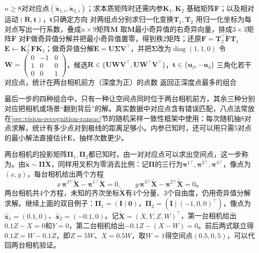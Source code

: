 \begin{algorithm}[归一化八点法与本质矩阵分解]
  \label{alg:vision-formation-eight-point}
  \begin{algorithmic}[1]
    \Require $n\ge8$对对应点$(\tilde{\bm x}_{1,i},\tilde{\bm x}_{2,i})$；求本质矩阵时还需内参$\bm K_1,\bm K_2$
    \Ensure 基础矩阵$\bm F$；以及相对运动$(\bm R,\bm t)$，$\bm t$只确定方向
    \State 对两组点分别求归一化变换$\bm T_1,\bm T_2$
    \State 用归一化坐标为每对点写出一行系数，叠成$n\times9$矩阵$\bm M$
    \State 取$\bm M$最小奇异值的右奇异向量，排成$3\times3$矩阵$\tilde{\bm F}$
    \State 对$\tilde{\bm F}$做奇异值分解并把最小奇异值置零，得到秩2矩阵；还原$\bm F=\bm T_2^\top\tilde{\bm F}\bm T_1$
    \State $\bm E\gets\bm K_2^\top\bm F\bm K_1$；做奇异值分解$\bm E=\bm U\bm\Sigma\bm V^\top$，并把$\bm\Sigma$改为$\operatorname{diag}(1,1,0)$
    \State 令$\bm W=\begin{pmatrix}0&-1&0\\1&0&0\\0&0&1\end{pmatrix}$，候选$\bm R\in\{\bm U\bm W\bm V^\top,\bm U\bm W^\top\bm V^\top\}$，$\bm t\in\{\bm u_3,-\bm u_3\}$
      \State 三角化若干对应点，统计在两台相机前方（深度为正）的点数
    \EndFor
    \State 返回正深度点最多的组合
  \end{algorithmic}
\end{algorithm}

最后一步的四种组合中，只有一种让空间点同时位于两台相机前方，其余三种分别对应把相机或场景“翻到背后”的解。真实数据中对应点含有错误匹配，八点法常放在\ref{sec:vision-recognition-ransac}节的随机采样一致性框架中使用：每次随机抽8对点求解，统计有多少点对到极线的距离足够小。内参已知时，还可以用只需5对点的最小解法直接估计$\bm E$，抽样次数更少。

两台相机的投影矩阵$\bm\Pi_1,\bm\Pi_2$都已知时，由一对对应点可以求出空间点，这一步称为。由$\tilde{\bm x}\sim\bm\Pi\tilde{\bm X}$，同样用叉积为零消去比例：记$\bm\Pi$的三行为$\bm\pi^{1\top},\bm\pi^{2\top},\bm\pi^{3\top}$，像点为$(x,y)$，每台相机给出两个方程
\[
  x\,\bm\pi^{3\top}\tilde{\bm X}-\bm\pi^{1\top}\tilde{\bm X}=0,\qquad
  y\,\bm\pi^{3\top}\tilde{\bm X}-\bm\pi^{2\top}\tilde{\bm X}=0\text{。}
\]
两台相机共4个方程，未知的齐次坐标$\tilde{\bm X}$有4个分量、3个自由度，仍用奇异值分解求解。继续上面的双目例子：$\bm\Pi_1=(\bm I\mid\bm0)$，$\bm\Pi_2=(\bm I\mid(-1,0,0)^\top)$，像点为$\hat{\bm x}_1=(0.1,0)$、$\hat{\bm x}_2=(-0.1,0)$。记$\tilde{\bm X}=(X,Y,Z,W)^\top$，第一台相机给出$0.1Z-X=0$和$Y=0$，第二台相机给出$-0.1Z-(X-W)=0$。前后两式联立得$0.1Z=W-0.1Z$，即$Z=5W$、$X=0.5W$，取$W=1$得空间点$(0.5,0,5)$，可以代回两台相机验证。

